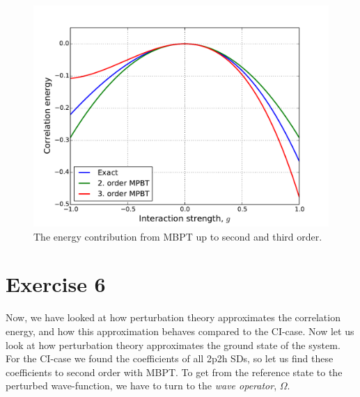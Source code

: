 \documentclass[a4paper, 11pt, notitlepage, english]{article}
\begin{document}
\begin{figure}[htbp]
\centering
\includegraphics[width=\textwidth]{pert_1.pdf}
\caption{The energy contribution from MBPT up to second and third order.}
\end{figure}


\clearpage

\section*{Exercise 6}

Now, we have looked at how perturbation theory approximates the correlation energy, and how this approximation behaves compared to the CI-case. Now let us look at how perturbation theory approximates the ground state of the system. For the CI-case we found the coefficients of all 2p2h SDs, so let us find these coefficients to second order with MBPT. To get from the reference state to the perturbed wave-function, we have to turn to the \emph{wave operator}, $\Omega$.
\end{document}
